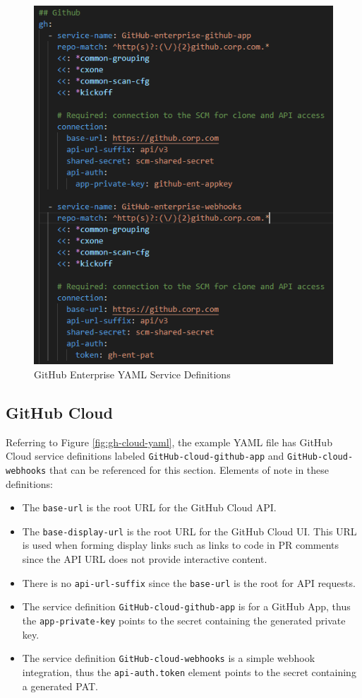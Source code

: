 \begin{figure}[h]
    \includegraphics[width=\textwidth]{graphics/gh-ent-yaml.png}
    \caption{GitHub Enterprise YAML Service Definitions}
    \label{fig:gh-ent-yaml}
\end{figure}


\subsection{GitHub Cloud}

Referring to Figure \ref{fig:gh-cloud-yaml}, the example YAML file has GitHub Cloud service definitions labeled
\texttt{GitHub-cloud-github-app} and \texttt{GitHub-cloud-webhooks} that can be referenced for this section.
Elements of note in these definitions:

\begin{itemize}
    \item The \texttt{base-url} is the root URL for the GitHub Cloud API.
    \item The \texttt{base-display-url} is the root URL for the GitHub Cloud UI. This URL is used
    when forming display links such as links to code in PR comments since the API URL does not
    provide interactive content.
    \item There is no \texttt{api-url-suffix} since the \texttt{base-url} is the root for API requests.
    \item The service definition \texttt{GitHub-cloud-github-app} is for a GitHub App, thus the \texttt{app-private-key} points to the secret
    containing the generated private key.
    \item The service definition \texttt{GitHub-cloud-webhooks} is a simple webhook integration, thus the \texttt{api-auth.token} element 
    points to the secret containing a generated PAT.
\end{itemize}


